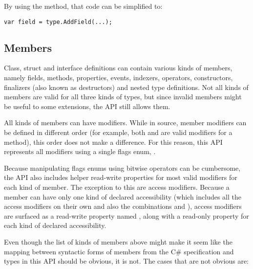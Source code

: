 By using the  method, that code can be simplified to:

\begin{verbatim}
var field = type.AddField(...);
\end{verbatim}

\subsection{Members}

Class, struct and interface definitions can contain various kinds of members, namely fields, methods, properties, events, indexers, operators, constructors, finalizers (also known as destructors) and nested type definitions. Not all kinds of members are valid for all three kinds of types, but since invalid members might be useful to some extensions, the \ac{API} still allows them.

All kinds of members can have modifiers. While in source, member modifiers can be defined in different order (for example, both  and  are valid modifiers for a method), this order does not make a difference. For this reason, this \ac{API} represents all modifiers using a single flags enum, . 

Because manipulating flags enums using bitwise operators can be cumbersome, the \ac{API} also includes helper read-write properties for most valid modifiers for each kind of member. The exception to this are access modifiers. Because a member can have only one kind of declared accessibility (which includes all the access modifiers on their own and also the combinations  and ), access modifiers are surfaced as a read-write property named , along with a read-only property for each kind of declared accessibility.

\medskip

Even though the list of kinds of members above might make it seem like the mapping between syntactic forms of members from the C\# specification and types in this \ac{API} should be obvious, it is not. The cases that are not obvious are:

